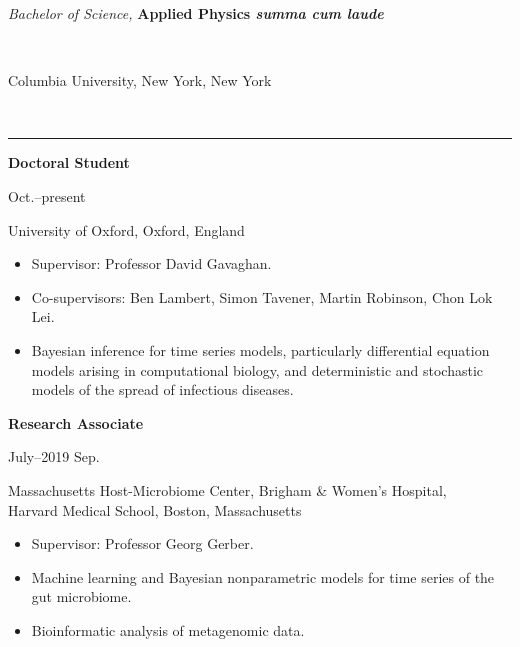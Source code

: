 \documentclass[11pt]{article}
\begin{document}
\noindent\parbox{.75\textwidth}{\raggedright \emph{Bachelor of Science,} \textbf{Applied Physics \emph{summa cum laude}}}
\parbox{.25\textwidth}{\raggedleft  ~}
Columbia University, New York, New York



\vspace{0.6cm}

\vspace{-2.75mm} \\
\rule{\textwidth}{0.4pt}
\vspace{0.1mm}
\noindent\parbox{.75\textwidth}{\raggedright \textbf{Doctoral Student}}
\parbox{.25\textwidth}{ Oct.--present}
University of Oxford, Oxford, England
\vspace{-.25cm}
\begin{itemize}
\item Supervisor: Professor David Gavaghan.
\vspace{-.3cm}
\item Co-supervisors: Ben Lambert, Simon Tavener, Martin Robinson, Chon Lok Lei.
\vspace{-.3cm}
\item Bayesian inference for time series models, particularly differential equation models arising in computational biology, and deterministic and stochastic models of the spread of infectious diseases.
\end{itemize}

\vspace{0.2cm}

\noindent\parbox{.75\textwidth}{\raggedright \textbf{Research Associate}}
\parbox{.25\textwidth}{ July--2019 Sep.}
Massachusetts Host-Microbiome Center, Brigham \& Women's Hospital,\\ Harvard Medical School, Boston, Massachusetts
\vspace{-.25cm}
\begin{itemize}
\item Supervisor: Professor Georg Gerber.
\vspace{-.3cm}
\item Machine learning and Bayesian nonparametric models for time series of the gut microbiome.
\vspace{-.3cm}
\item Bioinformatic analysis of metagenomic data.
\end{itemize}

\vspace{0.2cm}
\end{document}
